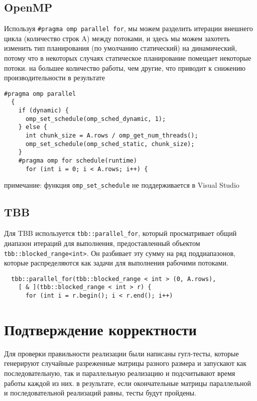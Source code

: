 \documentclass{report}
\begin{document}
\subsection*{OpenMP}
\par Используя \verb|#pragma omp parallel for|, мы можем разделить итерации внешнего цикла (количество строк A) между потоками, и здесь мы можем захотеть изменить тип планирования (по умолчанию статический) на динамический, потому что в некоторых случаях статическое планирование помещает некоторые потоки. на большее количество работы, чем другие, что приводит к снижению производительности в результате
\begin{lstlisting}
#pragma omp parallel
  {
    if (dynamic) {
      omp_set_schedule(omp_sched_dynamic, 1);
    } else {
      int chunk_size = A.rows / omp_get_num_threads();
      omp_set_schedule(omp_sched_static, chunk_size);
    }
    #pragma omp for schedule(runtime)
      for (int i = 0; i < A.rows; i++) {
\end{lstlisting}
примечание: функция \verb|omp_set_schedule| не поддерживается в Visual Studio
\newpage

\subsection*{TBB}
\par Для TBB используется \verb|tbb::parallel_for|, который просматривает общий диапазон итераций для выполнения, предоставленный объектом \newline \verb|tbb::blocked_range<int>|. Он разбивает эту сумму на ряд поддиапазонов, которые распределяются как задачи для выполнения рабочими потоками.
\begin{lstlisting}
  tbb::parallel_for(tbb::blocked_range < int > (0, A.rows),
    [ & ](tbb::blocked_range < int > r) {
      for (int i = r.begin(); i < r.end(); i++)
\end{lstlisting}

\newpage

\section*{Подтверждение корректности}
Для проверки правильности реализации были написаны гугл-тесты, которые генерируют случайные разреженные матрицы разного размера и запускают как последовательную, так и параллельную реализацию и подсчитывают время работы каждой из них. в результате, если окончательные матрицы параллельной и последовательной реализаций равны, тесты будут пройдены.
\newpage
\end{document}
